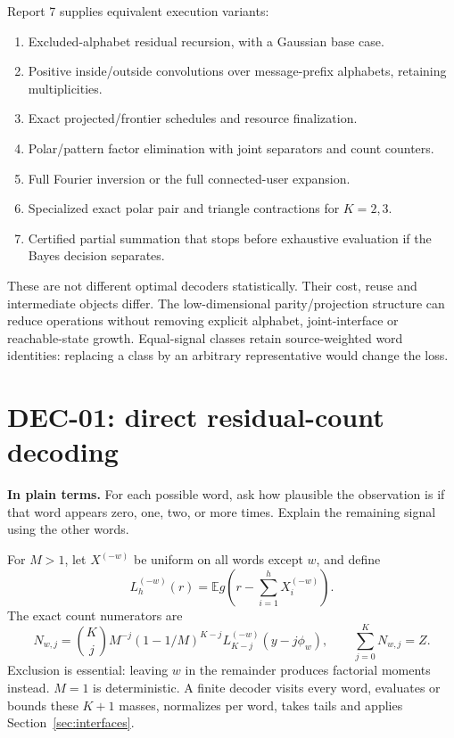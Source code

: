 \documentclass[10pt,a4paper]{article}
\newcommand{\E}{\mathbb E}
\begin{document}
Report 7 supplies equivalent execution variants:
\begin{enumerate}
\item Excluded-alphabet residual recursion, with a Gaussian base case.
\item Positive inside/outside convolutions over message-prefix alphabets, retaining multiplicities.
\item Exact projected/frontier schedules and resource finalization.
\item Polar/pattern factor elimination with joint separators and count counters.
\item Full Fourier inversion or the full connected-user expansion.
\item Specialized exact polar pair and triangle contractions for $K=2,3$.
\item Certified partial summation that stops before exhaustive evaluation if the Bayes decision separates.
\end{enumerate}
These are not different optimal decoders statistically. Their cost, reuse and intermediate objects differ.
The low-dimensional parity/projection structure can reduce operations without removing explicit alphabet,
joint-interface or reachable-state growth. Equal-signal classes retain source-weighted word identities:
replacing a class by an arbitrary representative would change the loss.

\clearpage
\section{DEC-01: direct residual-count decoding}
\label{sec:direct}
\textbf{In plain terms.} For each possible word, ask how plausible the observation is if that word appears
zero, one, two, or more times. Explain the remaining signal using the other words.

For $M>1$, let $X^{(-w)}$ be uniform on all words except $w$, and define
\[
 L_h^{(-w)}(r)=\E g\!\left(r-\sum_{i=1}^hX_i^{(-w)}\right).
\]
The exact count numerators are
\begin{equation}
 N_{w,j}=\binom Kj M^{-j}(1-1/M)^{K-j}
              L_{K-j}^{(-w)}(y-j\phi_w),\qquad \sum_{j=0}^KN_{w,j}=Z.
 \label{eq:direct-count}
\end{equation}
Exclusion is essential: leaving $w$ in the remainder produces factorial moments instead.
$M=1$ is deterministic. A finite decoder visits every word, evaluates or bounds these $K+1$ masses,
normalizes per word, takes tails and applies Section~\ref{sec:interfaces}.
\end{document}
